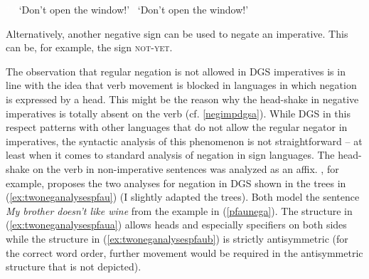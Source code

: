 \begin{exe}
\ex\label{negimpdgs}\begin{xlist} 
\ex\label{negimpdgsa} \textcolor{white}{*}
\glt \textcolor{white}{*}`Don't open the window!'
\ex *
\glt \textcolor{white}{*}`Don't open the window!'
\end{xlist}
\end{exe} 

\noindent Alternatively, another negative sign can be used to negate an imperative. This can be, for example, the sign \textsc{not-yet}. %

The observation that regular negation is not allowed in DGS imperatives is in line with the idea that verb movement is blocked in languages in which negation is expressed by a head. This might be the reason why the head-shake in negative imperatives is totally absent on the verb (cf. \ref{negimpdgsa}). While DGS in this respect patterns with other languages that do not allow the regular negator in imperatives, the syntactic analysis of this phenomenon is not straightforward -- at least when it comes to standard analysis of negation in sign languages. The head-shake on the verb in non-imperative sentences was analyzed as an affix. \citet[57]{pfau2016featural}, for example, proposes the two analyses for negation in DGS shown in the trees in (\ref{ex:twoneganalysespfau}) (I slightly adapted the trees). Both model the sentence \textit{My brother doesn't like wine} from the example in (\ref{pfaunega}). The structure in (\ref{ex:twoneganalysespfaua}) allows heads and especially specifiers on both sides while the structure in (\ref{ex:twoneganalysespfaub}) is strictly antisymmetric (for the correct word order, further movement would be required in the antisymmetric structure that is not depicted).


